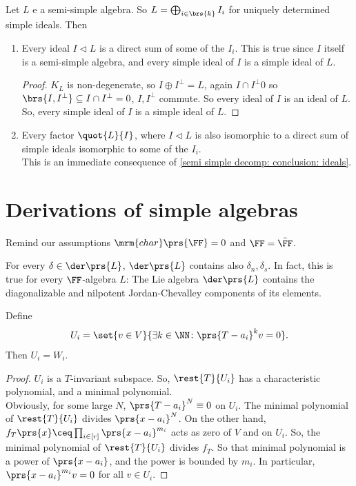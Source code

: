 \documentclass[10pt,a4paper,twoside,openany,hidelinks]{book}
\begin{document}
\begin{conclusion}
Let $L$ e a semi-simple algebra. So $L = \bigoplus_{i\in\brs{k}} I_i$ for uniquely determined simple ideals. Then
\begin{enumerate}
\item Every ideal $I \triangleleft L$ is a direct sum of some of the $I_i$. This is true since $I$ itself is a semi-simple algebra, and every simple ideal of $I$ is a simple ideal of $L$.\\ \label{semi simple decomp: conclusion: ideals}
\begin{proof}
$K_L$ is non-degenerate, so $I \oplus I^{\perp} = L$, again $I \cap I^{\perp} 0$ so $\brs{I,I^{\perp}} \subseteq I \cap I^{\perp} = 0$, $I, I^{\perp}$ commute. So every ideal of $I$ is an ideal of $L$. So, every simple ideal of $I$ is a simple ideal of $L$.
\end{proof}

\item Every factor $\quot{L}{I}$, where $I \triangleleft L$ is also isomorphic to a direct sum of simple ideals isomorphic to some of the $I_i$.\\
This is an immediate consequence of \ref{semi simple decomp: conclusion: ideals}.

\end{enumerate}
\end{conclusion}

\chapter{Derivations of simple algebras}

Remind our assumptions $\mrm{char}\prs{\FF} = 0$ and $\FF = \bar{\FF}$.

\begin{theorem}
\label{F_algebra_jordan_chevalley_components}
For every $\delta \in \der\prs{L}$, $\der\prs{L}$ contains also $\delta_n, \delta_s$.
In fact, this is true for every $\FF$-algebra $L$:
The Lie algebra $\der \prs{L}$ contains the diagonalizable and nilpotent Jordan-Chevalley components of its elements.
\end{theorem}

\begin{proposition}
Define \[U_i = \set{v \in V}{\exists k \in \NN \colon \prs{T-a_i}^{k} v = 0}\text{.}\]
Then $U_i = W_i$.
\end{proposition}
\begin{proof}
$U_i$ is a $T$-invariant subspace. So, $\rest{T}{U_i}$ has a characteristic polynomial, and a minimal polynomial.\\
Obviously, for some large $N$, $\prs{T-a_i}^N \equiv 0$ on $U_i$.
The minimal polynomial of $\rest{T}{U_i}$ divides $\prs{x-a_i}^N$. On the other hand, $f_T\prs{x} \ceq \prod_{i\in[r]} \prs{x-a_i}^{m_i}$ acts as zero of $V$ and on $U_i$. So, the minimal polynomial of $\rest{T}{U_i}$ divides $f_T$. So that minimal polynomial is a power of $\prs{x-a_i}$, and the power is bounded by $m_i$.
In particular, $\prs{x-a_i}^{m_i}v = 0$ for all $v \in U_i$.
\end{proof}
\end{document}
